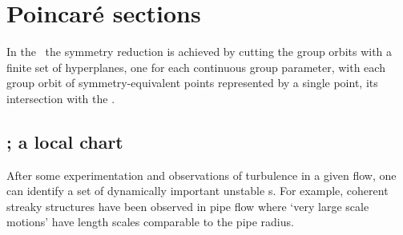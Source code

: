 

\section{Poincar\'e sections}
\label{s:cut}


In the \mslices\ the symmetry reduction is achieved by cutting the group
orbits with a finite set of hyperplanes, one for each continuous group
parameter, with each group orbit of
symmetry-equivalent points represented by a single point, its
intersection with the \slice.


\subsection{\Mslices; a local chart}

After some experimentation and observations of turbulence in a given
flow, one can identify a set of dynamically important unstable
{\recurrStr s}.  For example, coherent streaky structures have been
observed in pipe flow where `very large scale motions' have
length scales comparable to the pipe radius.
